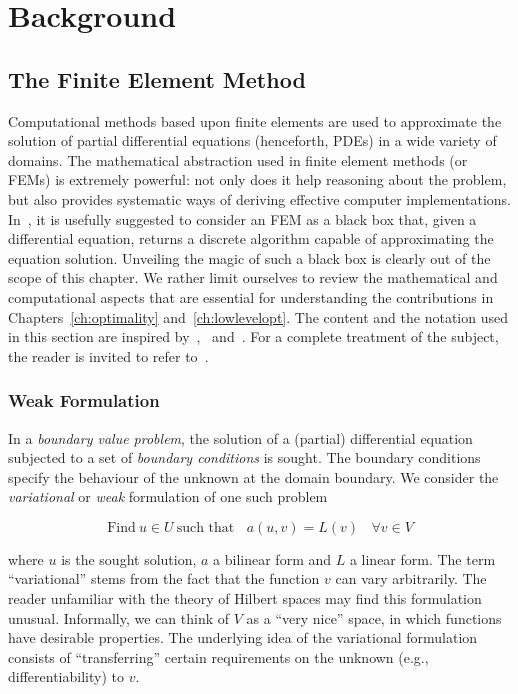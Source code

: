 \chapter{Background}

\section{The Finite Element Method}
\label{sec:bkg:fem}
Computational methods based upon finite elements are used to approximate the solution of partial differential equations (henceforth, PDEs) in a wide variety of domains. The mathematical abstraction used in finite element methods (or FEMs) is extremely powerful: not only does it help reasoning about the problem, but also provides systematic ways of deriving effective computer implementations. In~\cite{brenner-and-scott}, it is usefully suggested to consider an FEM as a black box that, given a differential equation, returns a discrete algorithm capable of approximating the equation solution. Unveiling the magic of such a black box is clearly out of the scope of this chapter. We rather limit ourselves to review the mathematical and computational aspects that are essential for understanding the contributions in Chapters~\ref{ch:optimality} and~\ref{ch:lowlevelopt}. The content and the notation used in this section are inspired by~\cite{florian-thesis},~\cite{Fenics} and~\cite{quadrature-olegaard}. For a complete treatment of the subject, the reader is invited to refer to~\cite{brenner-and-scott}.



\subsection{Weak Formulation}
\label{sec:bkg:var-problems}
In a {\em boundary value problem}, the solution of a (partial) differential equation subjected to a set of {\em boundary conditions} is sought. The boundary conditions specify the behaviour of the unknown at the domain boundary. We consider the {\em variational} or {\em weak} formulation of one such problem

\begin{equation}
\text{Find}\ u \in U\ \text{such that}\ \ \ \ a(u, v) = L(v)\ \ \ \ \forall v \in V
\end{equation}

where $u$ is the sought solution, $a$ a bilinear form and $L$ a linear form. The term ``variational'' stems from the fact that the function $v$ can vary arbitrarily. The reader unfamiliar with the theory of Hilbert spaces may find this formulation unusual. Informally, we can think of $V$ as a ``very nice'' space, in which functions have desirable properties. The underlying idea of the variational formulation consists of ``transferring'' certain requirements on the unknown (e.g., differentiability) to $v$. 


